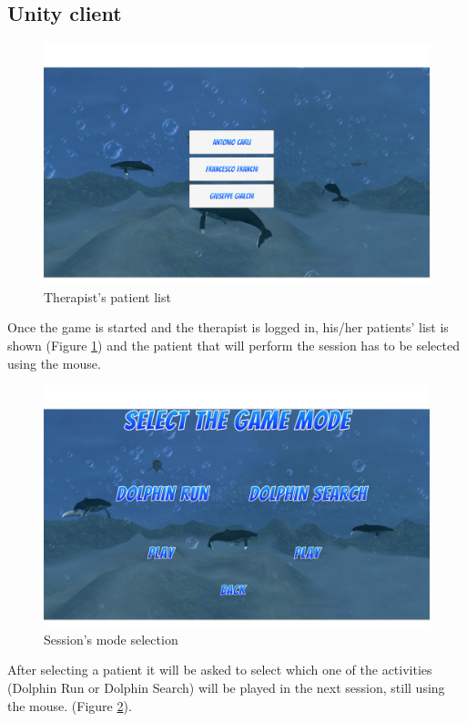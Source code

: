 \subsection{Unity client}
\begin{figure}[h!]
	\includegraphics[width=\textwidth]{images/UX/unity/menu/3-patientList}
	\caption{Therapist's patient list}
	\label{fig:unityPatList}
\end{figure}

Once the game is started and the therapist is logged in, his/her patients' list is shown (Figure \ref{fig:unityPatList}) and the patient that will perform the session has to be selected using the mouse.
\pagebreak
\begin{figure}[h!]
	\includegraphics[width=\textwidth]{images/UX/unity/menu/4-modeSelection}
	\caption{Session's mode selection}
	\label{fig:unityModSel}
\end{figure}

After selecting a patient it will be asked to select which one of the activities (Dolphin Run or Dolphin Search) will be played in the next session, still using the mouse. (Figure \ref{fig:unityModSel}).

